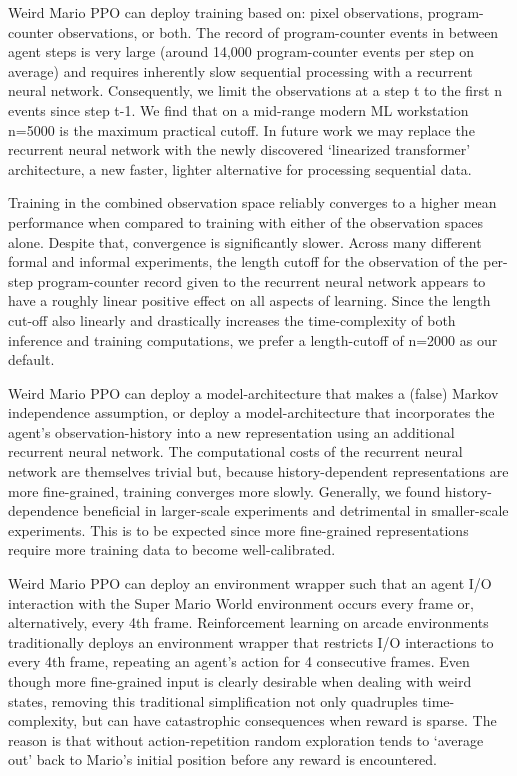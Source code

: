 \documentclass[]{article}
\begin{document}
Weird Mario PPO can deploy training based on: pixel observations,
program-counter observations, or both. The record of program-counter
events in between agent steps is very large (around 14,000
program-counter events per step on average) and requires inherently slow
sequential processing with a recurrent neural network. Consequently, we
limit the observations at a step t to the first n events since step t-1.
We find that on a mid-range modern ML workstation n=5000 is the maximum
practical cutoff. In future work we may replace the recurrent neural
network with the newly discovered `linearized transformer' architecture,
a new faster, lighter alternative for processing sequential data.

Training in the combined observation space reliably converges to a
higher mean performance when compared to training with either of the
observation spaces alone. Despite that, convergence is significantly
slower. Across many different formal and informal experiments, the
length cutoff for the observation of the per-step program-counter record
given to the recurrent neural network appears to have a roughly linear
positive effect on all aspects of learning. Since the length cut-off
also linearly and drastically increases the time-complexity of both
inference and training computations, we prefer a length-cutoff of n=2000
as our default.

Weird Mario PPO can deploy a model-architecture that makes a (false)
Markov independence assumption, or deploy a model-architecture that
incorporates the agent's observation-history into a new representation
using an additional recurrent neural network. The computational costs of
the recurrent neural network are themselves trivial but, because
history-dependent representations are more fine-grained, training
converges more slowly. Generally, we found history-dependence beneficial
in larger-scale experiments and detrimental in smaller-scale
experiments. This is to be expected since more fine-grained
representations require more training data to become well-calibrated.

Weird Mario PPO can deploy an environment wrapper such that an agent I/O
interaction with the Super Mario World environment occurs every frame
or, alternatively, every 4th frame. Reinforcement learning on arcade
environments traditionally deploys an environment wrapper that restricts
I/O interactions to every 4th frame, repeating an agent's action for 4
consecutive frames. Even though more fine-grained input is clearly
desirable when dealing with weird states, removing this traditional
simplification not only quadruples time-complexity, but can have
catastrophic consequences when reward is sparse. The reason is that
without action-repetition random exploration tends to `average out' back
to Mario's initial position before any reward is encountered.
\end{document}
